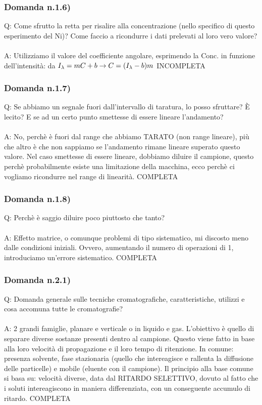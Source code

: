 \documentclass{article}
\begin{document}
\subsubsection{Domanda n.1.6)}
Q: Come sfrutto la retta per risalire alla concentrazione (nello specifico di questo esperimento del Ni)? Come faccio a ricondurre i dati prelevati al loro vero valore?
\\\\
A: Utilizziamo il valore del coefficiente angolare, esprimendo la Conc. in funzione dell'intensità: da $I_{\lambda} = mC + b \rightarrow C = (I_{\lambda} - b)\/m$ INCOMPLETA
\subsubsection{Domanda n.1.7)}
Q: Se abbiamo un segnale fuori dall'intervallo di taratura, lo posso sfruttare? È lecito? E se ad un certo punto smettesse di essere lineare l'andamento?
\\\\
A: No, perchè è fuori dal range che abbiamo TARATO (non range lineare), più che altro è che non sappiamo se l'andamento rimane lineare superato questo valore. Nel caso smettesse di essere lineare, dobbiamo diluire il campione, questo perchè probabilmente esiste una limitazione della macchina, ecco perchè ci vogliamo ricondurre nel range di linearità. COMPLETA 
\subsubsection{Domanda n.1.8)}
Q: Perchè è saggio diluire poco piuttosto che tanto?
\\\\
A: Effetto matrice, o comunque problemi di tipo sistematico, mi discosto meno dalle condizioni iniziali. Ovvero, aumentando il numero di operazioni di 1, introduciamo un'errore sistematico. COMPLETA

\subsubsection{Domanda n.2.1)}
Q: Domanda generale sulle tecniche cromatografiche, caratteristiche, utilizzi e cosa accomuna tutte le cromatografie?
\\\\
A: 2 grandi famiglie, planare e verticale o in liquido e gas. L'obiettivo è quello di separare diverse sostanze presenti dentro al campione. Questo viene fatto in base alla loro velocità di propagazione e il loro tempo di ritenzione. In comune: presenza solvente, fase stazionaria (quello che intereagisce e rallenta la diffusione delle particelle) e mobile (eluente con il campione). Il principio alla base comune si basa su: velocità diverse, data dal RITARDO SELETTIVO, dovuto al fatto che i soluti intereagiscono in maniera differenziata, con un conseguente accumulo di ritardo. COMPLETA
\end{document}
